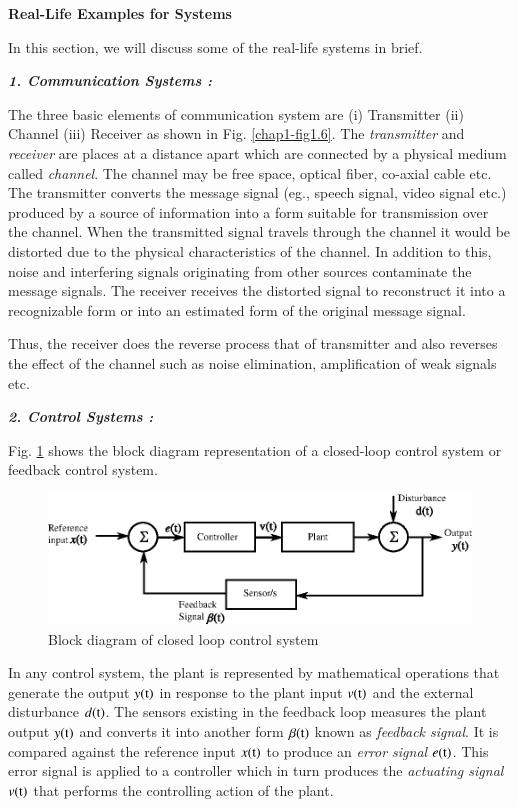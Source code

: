 \medskip
\noindent
{\bf Real-Life Examples for Systems}
\smallskip

In this section, we will discuss some of the real-life systems in brief.

\bigskip
\noindent
{\it\bfseries 1. Communication Systems :}
\smallskip

The three basic elements of communication system are (i) Transmitter (ii) Channel (iii) Receiver as shown in Fig. \ref{chap1-fig1.6}. The {\em transmitter} and {\em receiver} are places at a distance apart which are connected by a physical medium called {\em channel}. The channel may be free space, optical fiber, co-axial cable etc. The transmitter converts the message signal (eg., speech signal, video signal etc.) produced by a source of information into a form suitable for transmission over the channel. When the transmitted signal travels through the channel it would be distorted due to the physical characteristics of the channel. In addition to this, noise and interfering signals originating from other sources contaminate the message signals. The receiver receives the distorted signal to reconstruct it into a recognizable form or into an estimated form of the original message signal.

Thus, the receiver does the reverse process that of transmitter and also reverses the effect of the channel such as noise elimination, amplification of weak signals etc.

\bigskip
\noindent
{\it\bfseries 2. Control Systems :}
\smallskip

Fig. \ref{chap1-fig1.7} shows the block diagram representation of a closed-loop control system or feedback control system.
\begin{figure}[H]
\centering
\includegraphics{src/chap1/fig8.eps}
\caption{Block diagram of closed loop control system}\label{chap1-fig1.7}
\end{figure}

In any control system, the plant is represented by mathematical operations that generate the output $y(\textrm{t})$ in response to the plant input $v(\textrm{t})$ and the external disturbance $d(\textrm{t})$. The sensors existing in the feedback loop measures the plant output $y(\textrm{t})$ and converts it into another form $\beta(\textrm{t})$ known as {\em feedback signal}. It is compared against the reference input $x(\textrm{t})$ to produce an {\em error signal} $e(\textrm{t})$. This error signal is applied to a controller which in turn produces the {\em actuating signal} $v(\textrm{t})$ that performs the controlling action of the plant.

